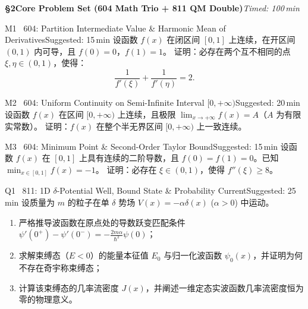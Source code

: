 \documentclass[a4paper,11pt]{article}
\begin{document}
\clearpage

{\Large\sffamily\bfseries\color{navy} \S 2\quad Core Problem Set (604 Math Trio + 811 QM Double)}\hfill{\small\sffamily\color{mist}\itshape Timed: 100\,min}

\vspace{5pt}

\begin{problem}{M1 \textbar\ 604: Partition Intermediate Value \& Harmonic Mean of Derivatives}{Suggested: 15\,min}
设函数 $f(x)$ 在闭区间 $[0, 1]$ 上连续，在开区间 $(0, 1)$ 内可导，且 $f(0) = 0$，$f(1) = 1$。
证明：必存在两个互不相同的点 $\xi, \eta \in (0, 1)$，使得：
\[
  \frac{1}{f'(\xi)} + \frac{1}{f'(\eta)} = 2.
\]
\end{problem}

\vspace{3pt}

\begin{problem}{M2 \textbar\ 604: Uniform Continuity on Semi-Infinite Interval $[0,+\infty)$}{Suggested: 20\,min}
设函数 $f(x)$ 在区间 $[0, +\infty)$ 上连续，且极限 $\lim_{x \to +\infty} f(x) = A$（$A$ 为有限实常数）。
证明：$f(x)$ 在整个半无界区间 $[0, +\infty)$ 上一致连续。
\end{problem}

\vspace{3pt}

\begin{problem}{M3 \textbar\ 604: Minimum Point \& Second-Order Taylor Bound}{Suggested: 15\,min}
设函数 $f(x)$ 在 $[0, 1]$ 上具有连续的二阶导数，且 $f(0) = f(1) = 0$。已知 $\min_{x \in [0,1]} f(x) = -1$。
证明：必存在 $\xi \in (0, 1)$，使得 $f''(\xi) \ge 8$。
\end{problem}

\vspace{3pt}

\begin{problem}{Q1 \textbar\ 811: 1D $\delta$-Potential Well, Bound State \& Probability Current}{Suggested: 25\,min}
设质量为 $m$ 的粒子在单 $\delta$ 势场 $V(x) = -\alpha \delta(x)$ ($\alpha > 0$) 中运动。
\begin{enumerate}[leftmargin=1.5em,itemsep=1pt,topsep=1pt]
  \item 严格推导波函数在原点处的导数跃变匹配条件 $\psi'(0^+) - \psi'(0^-) = -\frac{2m\alpha}{\hbar^2}\psi(0)$；
  \item 求解束缚态（$E < 0$）的能量本征值 $E_0$ 与归一化波函数 $\psi_0(x)$，并证明为何不存在奇宇称束缚态；
  \item 计算该束缚态的几率流密度 $J(x)$，并阐述一维定态实波函数几率流密度恒为零的物理意义。
\end{enumerate}
\end{problem}
\end{document}
